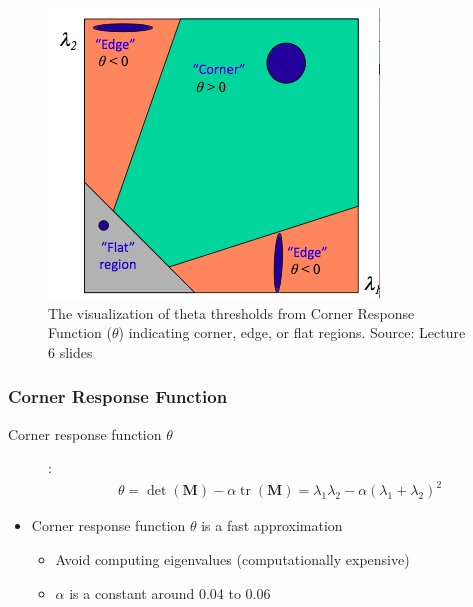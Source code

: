\documentclass[letterpaper,12pt]{article}
\newcommand{\matr}[1]{\mathbf{#1}}
\DeclareMathOperator{\tr}{tr}
\begin{document}
\begin{figure}[H]
 \centering
 \includegraphics[scale=0.5]{images/eigenvalues_harris.png}
 \caption{The visualization of theta thresholds from Corner Response Function ($\theta$) indicating corner, edge, or flat regions. Source: Lecture 6 slides}
\end{figure}

\subsubsection{Corner Response Function}
\begin{description}
 \item[Corner response function $\theta$]:
       \begin{align}
        \theta = \det(\matr{M}) - \alpha \tr(\matr{M}) = \lambda_1 \lambda_2 - \alpha(\lambda_1 + \lambda_2)^2
       \end{align}
\end{description}
\begin{itemize}
 \item Corner response function $\theta$ is a fast approximation
       \begin{itemize}
        \item Avoid computing eigenvalues (computationally expensive)
        \item $\alpha$ is a constant around 0.04 to 0.06
       \end{itemize}
\end{itemize}
\end{document}
